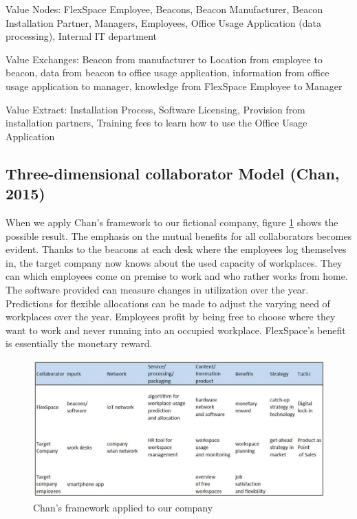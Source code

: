 		Value Nodes: FlexSpace Employee, Beacons, Beacon Manufacturer, Beacon Installation Partner, Managers, Employees, Office Usage Application (data processing), Internal IT department

		Value Exchanges: Beacon from manufacturer to Location from employee to beacon, data from beacon to office usage application, information from office usage application to manager, knowledge from FlexSpace Employee to Manager

		Value Extract: Installation Process, Software Licensing, Provision from installation partners, Training fees to learn how to use the Office Usage Application

	\subsection{Three-dimensional collaborator Model (Chan, 2015)}

	When we apply Chan's framework to our fictional company, figure \ref{use case chan} shows the possible result. The emphasis on the mutual benefits for all collaborators becomes evident. Thanks to the beacons at each desk where the employees log themselves in, the target company now knows about the used capacity of workplaces. They can which employees come on premise to work and who rather works from home. The software provided can measure changes in utilization over the year. Predictions for flexible allocations can be made to adjust the varying need of workplaces over the year. Employees profit by being free to choose where they want to work and never running into an occupied workplace. FlexSpace's benefit is essentially the monetary reward.

	\begin{figure}[ht]
	    \begin{center}
	    \includegraphics[scale=0.55]{Talk11/chanexampleusecase.jpg}
	    \end{center}
	    \caption{Chan's framework applied to our company}
	    \label{use case chan}
    \end{figure}

